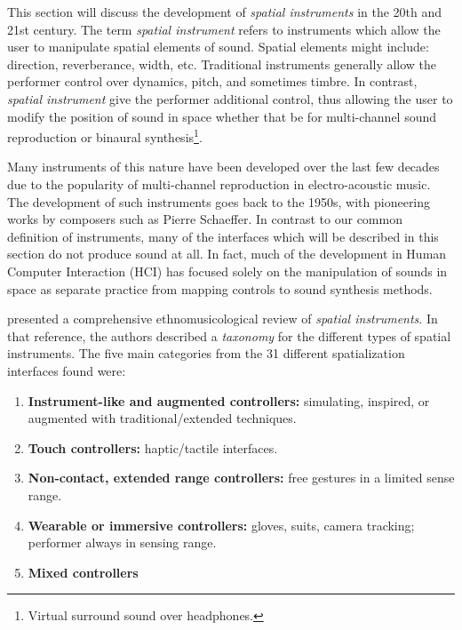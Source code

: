 This section will discuss the development of \textit{spatial instruments} in the 20th and 21st century. The term \textit{spatial instrument} refers to instruments which allow the user to manipulate spatial elements of sound. Spatial elements might include: direction, reverberance, width, etc. Traditional instruments generally allow the performer control over dynamics, pitch, and sometimes timbre. In contrast, \textit{spatial instrument} give the performer additional control, thus allowing the user to modify the position of sound in space whether that be for multi-channel sound reproduction or binaural synthesis\footnote{Virtual surround sound over headphones.}. 

Many instruments of this nature have been developed over the last few decades due to the popularity of multi-channel reproduction in electro-acoustic music. The development of such instruments goes back to the 1950s, with pioneering works by composers such as Pierre Schaeffer. In contrast to our common definition of instruments, many of the interfaces which will be described in this section do not produce sound at all. In fact, much of the development in Human Computer Interaction (HCI) has focused solely on the manipulation of sounds in space as separate practice from mapping controls to sound synthesis methods.  

\cite{pysiewicz2017instruments} presented a comprehensive ethnomusicological review of \textit{spatial instruments}. In that reference, the authors described a \textit{taxonomy} for the different types of spatial instruments. The five main categories from the 31 different spatialization interfaces found were: 

\begin{enumerate}
    \item \textbf{Instrument-like and augmented controllers:} simulating, inspired, or augmented with traditional/extended techniques. 
    \item \textbf{Touch controllers:} haptic/tactile interfaces.
    \item \textbf{Non-contact, extended range controllers:} free gestures in a limited sense range. 
    \item \textbf{Wearable or immersive controllers:} gloves, suits, camera tracking; performer always in sensing range.
    \item \textbf{Mixed controllers}
\end{enumerate}

